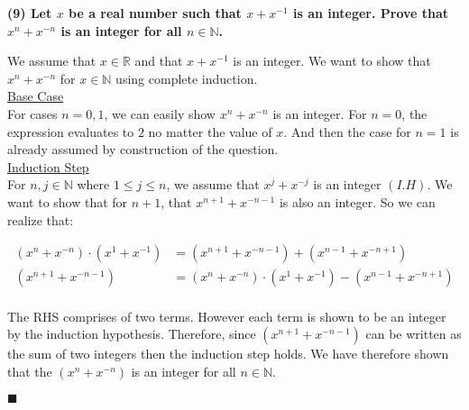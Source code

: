 \documentclass[20pt]{article}
\begin{document}
\newpage
\noindent
\textbf{(9) Let $x$ be a real number such that $x + x^{-1}$ is an integer. Prove that $x^n + x^{-n}$ is an integer for all $n \in \mathbb{N}$.}\\
\begin{text}
    We assume that $x \in \mathbb{R}$ and that $x + x^{-1}$ is an integer. We want to show that $x^{n} + x^{-n}$ for $x \in \mathbb{N}$ using complete induction.\\
    
    \noindent
    \underline{Base Case}\\
    For cases $n = 0,1$, we can easily show $x^n + x^{-n}$ is an integer. For $n = 0$, the expression evaluates to $2$ no matter the value of $x$. And then the case for $n = 1$ is already assumed by construction of the question.\\
    
    \noindent
    \underline{Induction Step}\\
    For $n,j \in \mathbb{N}$ where $1 \leq j \leq n$, we assume that $x^j + x^{-j}$ is an integer $(I.H)$. We want to show that for $n + 1$, that $x^{n+1} + x^{-n-1}$ is also an integer. So we can realize that:
    
    \begin{align}
        (x^n + x^{-n}) \cdot (x^1 + x^{-1}) &= (x^{n + 1} + x^{- n - 1}) + (x^{n - 1} + x^{- n + 1})\nonumber\\
        (x^{n + 1} + x^{- n - 1}) &= (x^n + x^{-n}) \cdot (x^1 + x^{-1}) - (x^{n - 1} + x^{- n + 1})\nonumber
    \end{align}\\
    
    \noindent
    The RHS comprises of two terms. However each term is shown to be an integer by the induction hypothesis. Therefore, since $(x^{n + 1} + x^{- n - 1})$ can be written as the sum of two integers then the induction step holds. We have therefore shown that the $(x^n + x^{-n})$ is an integer for all $n \in \mathbb{N}$.
    
    \hfill $\blacksquare$
\end{text}\\
\end{document}
